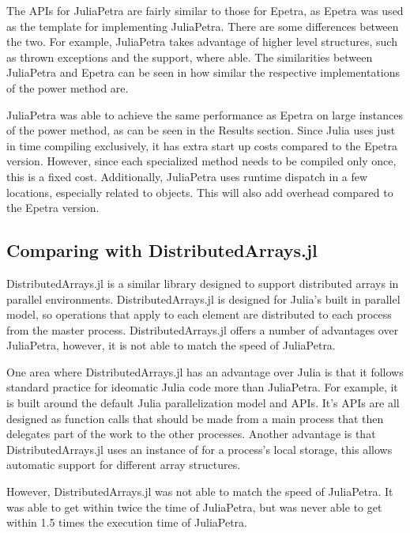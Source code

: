 \documentclass[acmsmall]{acmart}
\newcommand{\juliaSnippet}[1]{\texttt{\detokenize{#1}}}
\begin{document}
The APIs for JuliaPetra are fairly similar to those for Epetra,
as Epetra was used as the template for implementing JuliaPetra.
There are some differences between the two.
For example, JuliaPetra takes advantage of higher level structures, such as thrown exceptions and
the \juliaSnippet{AbstractArray} support, where able.
The similarities between JuliaPetra and Epetra can be seen in how similar the respective implementations
of the power method are.

JuliaPetra was able to achieve the same performance as Epetra on large instances of the power method,
as can be seen in the Results section.
Since Julia uses just in time compiling exclusively, it has extra start up costs compared to
the Epetra version. However, since each specialized method needs to be compiled only once,
this is a fixed cost.
Additionally, JuliaPetra uses runtime dispatch in a few locations, especially related to
\juliaSnippet{Comm} objects.  This will also add overhead compared to the Epetra version.

\subsection{Comparing with DistributedArrays.jl}

DistributedArrays.jl is a similar library designed to support distributed arrays in parallel environments.
\cite{DAGithub}
DistributedArrays.jl is designed for Julia's built in parallel model, so operations that apply to
each element are distributed to each process from the master process.
DistributedArrays.jl offers a number of advantages over JuliaPetra, however, it is not able to
match the speed of JuliaPetra.

One area where DistributedArrays.jl has an advantage over Julia is that it follows standard
practice for ideomatic Julia code more than JuliaPetra.
For example, it is built around the default Julia parallelization model and APIs.
It's APIs are all designed as function calls that should be made from a main process that
then delegates part of the work to the other processes. %
Another advantage is that DistributedArrays.jl uses an instance of \juliaSnippet{AbstractArray}
for a process's local storage, this allows automatic support for different array structures.

However, DistributedArrays.jl was not able to match the speed of JuliaPetra.
It was able to get within twice the time of JuliaPetra, but was never able to get within 1.5 times
the execution time of JuliaPetra.
\end{document}
